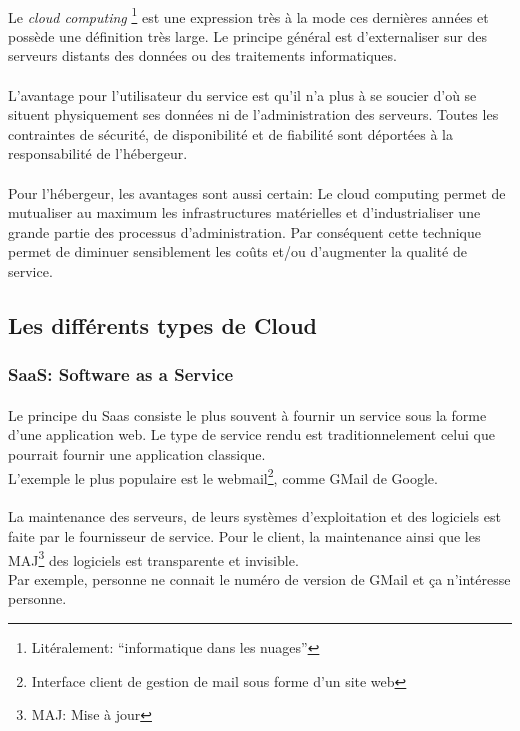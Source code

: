 \paragraph*{}
Le \emph{cloud computing} \footnote{Litéralement: ``informatique dans les nuages''} est une expression
très à la mode ces dernières années et possède une définition très large.
Le principe général est d'externaliser sur des serveurs distants des données ou
des traitements informatiques.

\paragraph*{}
L'avantage pour l'utilisateur du service est qu'il n'a plus à se soucier d'où se situent physiquement
ses données ni de l'administration des serveurs. Toutes les contraintes de sécurité, de disponibilité
et de fiabilité sont déportées à la responsabilité de l'hébergeur.

\paragraph*{}
Pour l'hébergeur, les avantages sont aussi certain: Le cloud computing permet de mutualiser au maximum
les infrastructures matérielles et d'industrialiser une grande partie des processus d'administration.
Par conséquent cette technique permet de diminuer sensiblement les coûts et/ou d'augmenter la qualité
de service.

\subsection{Les différents types de Cloud}

\subsubsection{SaaS: Software as a Service}
\paragraph*{}
Le principe du Saas consiste le plus souvent à fournir un service sous la forme d'une application web.
Le type de service rendu est traditionnelement celui que pourrait fournir une application classique.
\\
L'exemple le plus populaire est le webmail\footnote{Interface client de gestion de mail sous forme d'un site web}, comme GMail de Google.

\paragraph*{}
La maintenance des serveurs, de leurs systèmes d'exploitation et des logiciels est faite par le fournisseur de service.
Pour le client, la maintenance ainsi que les MAJ\footnote{MAJ: Mise à jour} des logiciels est transparente et invisible.
\\
Par exemple, personne ne connait le numéro de version de GMail et ça n'intéresse personne.

